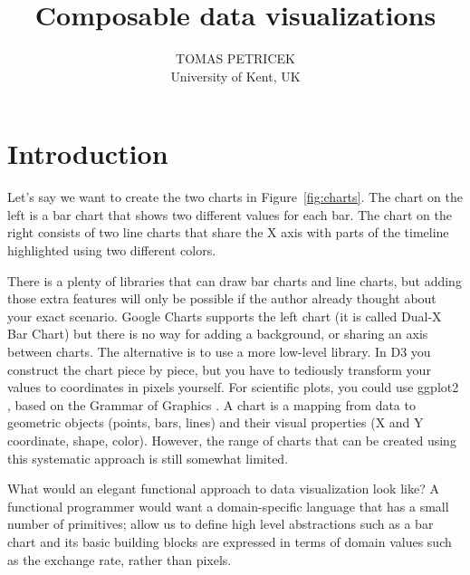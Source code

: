 \documentclass{jfp}
\title{Composable data visualizations}
\author[Tomas Petricek]{TOMAS PETRICEK\\
       University of Kent, UK\\
       \email{t.petricek@kent.ac.uk}}
\begin{document}
\maketitle[f]



\section{Introduction}
Let's say we want to create the two charts in Figure~\ref{fig:charts}. The chart on the left is
a bar chart that shows two different values for each bar. The chart on the right consists of two
line charts that share the X axis with parts of the timeline highlighted using two different colors.

There is a plenty of libraries that can draw bar charts and line charts, but adding those extra
features will only be possible if the author already thought about your exact scenario.
Google Charts \cite{gcharts} supports the left chart (it is called Dual-X Bar Chart) but there is no
way for adding a background, or sharing an axis between charts. The alternative is to use a more
low-level library. In D3 \cite{d3} you construct the chart piece by piece, but you have to
tediously transform your values to coordinates in pixels yourself. For scientific plots,
you could use ggplot2 \cite{ggplot2}, based on the Grammar of Graphics \cite{grammar}.
A chart is a mapping from data to geometric objects (points, bars, lines) and their visual
properties (X and Y coordinate, shape, color). However, the range of charts that can be
created using this systematic approach is still somewhat limited.

What would an elegant functional approach to data visualization look like? A functional programmer
would want a domain-specific language that has a small number of primitives; allow us to define
high level abstractions such as a bar chart and its basic building blocks are expressed in terms
of domain values such as the exchange rate, rather than pixels.
\end{document}
